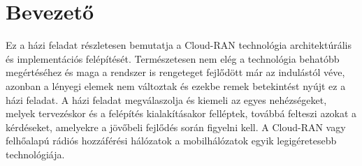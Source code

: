 \chapter*{Bevezető}
\hspace{2mm}
Ez a házi feladat részletesen bemutatja a Cloud-RAN technológia architektúrális és implementációs felépítését. Természetesen nem elég a technológia behatóbb megértéséhez és maga a rendszer is rengeteget fejlődött már az indulástól véve, azonban a lényegi elemek nem változtak és ezekbe remek betekintést nyújt ez a házi feladat.
A házi feladat megválaszolja és kiemeli az egyes nehézségeket, melyek tervezéskor és a felépítés kialakításakor felléptek, továbbá felteszi azokat a kérdéseket, amelyekre a jövőbeli fejlődés során figyelni kell.
A Cloud-RAN vagy felhőalapú rádiós hozzáférési hálózatok a mobilhálózatok egyik legigéretesebb technológiája.